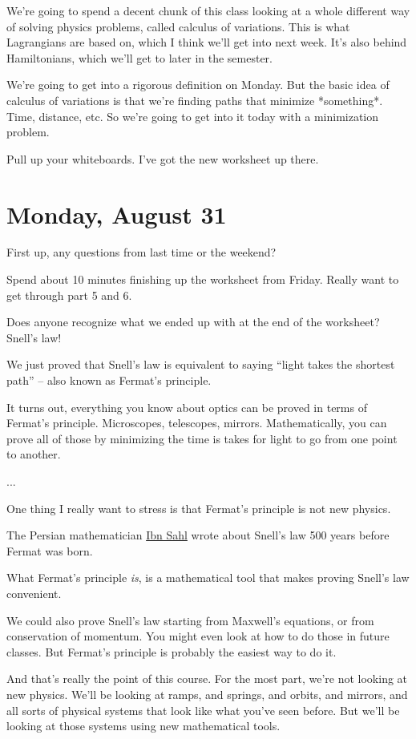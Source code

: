 \documentclass[10pt]{article}
\begin{document}
We're going to spend a decent chunk of this class looking at a whole different way of solving physics problems, called calculus of variations. This is what Lagrangians are based on, which I think we'll get into next week. It's also behind Hamiltonians, which we'll get to later in the semester. 

We're going to get into a rigorous definition on Monday. But the basic idea of calculus of variations is that we're finding paths that minimize *something*. Time, distance, etc. So we're going to get into it today with a minimization problem. 

Pull up your whiteboards. I've got the new worksheet up there. 

\section*{Monday, August 31}

First up, any questions from last time or the weekend?

Spend about 10 minutes finishing up the worksheet from Friday. Really want to get through part 5 and 6. 

Does anyone recognize what we ended up with at the end of the worksheet? Snell's law!

We just proved that Snell's law is equivalent to saying ``light takes the shortest path'' -- also known as Fermat's principle. 

It turns out, everything you know about optics can be proved in terms of Fermat's principle. Microscopes, telescopes, mirrors. Mathematically, you can prove all of those by minimizing the time is takes for light to go from one point to another. 

...

One thing I really want to stress is that Fermat's principle is not new physics. 

The Persian mathematician \href{https://en.wikipedia.org/wiki/Ibn_Sahl_(mathematician)}{Ibn Sahl} wrote about Snell's law 500 years before Fermat was born. 

What Fermat's principle \textit{is}, is a mathematical tool that makes proving Snell's law convenient.

We could also prove Snell's law starting from Maxwell's equations, or from conservation of momentum. You might even look at how to do those in future classes. But Fermat's principle is probably the easiest way to do it. 

And that's really the point of this course. For the most part, we're not looking at new physics. We'll be looking at ramps, and springs, and orbits, and mirrors, and all sorts of physical systems that look like what you've seen before. But we'll be looking at those systems using new mathematical tools. 
\end{document}

